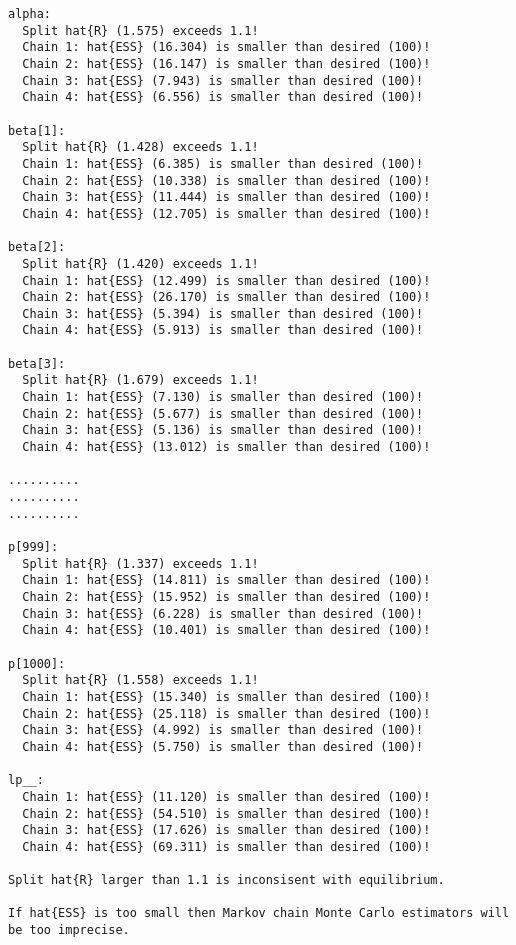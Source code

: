\documentclass[
  letterpaper,
  DIV=11,
  numbers=noendperiod]{scrartcl}
\begin{document}
\begin{verbatim}
alpha:
  Split hat{R} (1.575) exceeds 1.1!
  Chain 1: hat{ESS} (16.304) is smaller than desired (100)!
  Chain 2: hat{ESS} (16.147) is smaller than desired (100)!
  Chain 3: hat{ESS} (7.943) is smaller than desired (100)!
  Chain 4: hat{ESS} (6.556) is smaller than desired (100)!

beta[1]:
  Split hat{R} (1.428) exceeds 1.1!
  Chain 1: hat{ESS} (6.385) is smaller than desired (100)!
  Chain 2: hat{ESS} (10.338) is smaller than desired (100)!
  Chain 3: hat{ESS} (11.444) is smaller than desired (100)!
  Chain 4: hat{ESS} (12.705) is smaller than desired (100)!

beta[2]:
  Split hat{R} (1.420) exceeds 1.1!
  Chain 1: hat{ESS} (12.499) is smaller than desired (100)!
  Chain 2: hat{ESS} (26.170) is smaller than desired (100)!
  Chain 3: hat{ESS} (5.394) is smaller than desired (100)!
  Chain 4: hat{ESS} (5.913) is smaller than desired (100)!

beta[3]:
  Split hat{R} (1.679) exceeds 1.1!
  Chain 1: hat{ESS} (7.130) is smaller than desired (100)!
  Chain 2: hat{ESS} (5.677) is smaller than desired (100)!
  Chain 3: hat{ESS} (5.136) is smaller than desired (100)!
  Chain 4: hat{ESS} (13.012) is smaller than desired (100)!

..........
..........
..........

p[999]:
  Split hat{R} (1.337) exceeds 1.1!
  Chain 1: hat{ESS} (14.811) is smaller than desired (100)!
  Chain 2: hat{ESS} (15.952) is smaller than desired (100)!
  Chain 3: hat{ESS} (6.228) is smaller than desired (100)!
  Chain 4: hat{ESS} (10.401) is smaller than desired (100)!

p[1000]:
  Split hat{R} (1.558) exceeds 1.1!
  Chain 1: hat{ESS} (15.340) is smaller than desired (100)!
  Chain 2: hat{ESS} (25.118) is smaller than desired (100)!
  Chain 3: hat{ESS} (4.992) is smaller than desired (100)!
  Chain 4: hat{ESS} (5.750) is smaller than desired (100)!

lp__:
  Chain 1: hat{ESS} (11.120) is smaller than desired (100)!
  Chain 2: hat{ESS} (54.510) is smaller than desired (100)!
  Chain 3: hat{ESS} (17.626) is smaller than desired (100)!
  Chain 4: hat{ESS} (69.311) is smaller than desired (100)!

Split hat{R} larger than 1.1 is inconsisent with equilibrium.

If hat{ESS} is too small then Markov chain Monte Carlo estimators will be too imprecise.
\end{verbatim}
\end{document}
